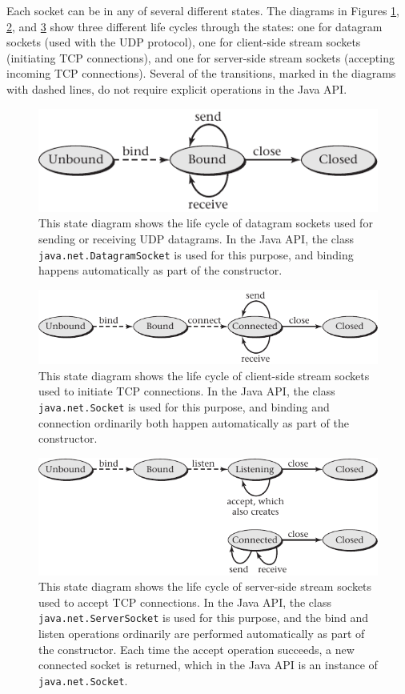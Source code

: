 Each socket can be in any of several different states.  The diagrams
in Figures \ref{scan-9-3}, \ref{scan-9-4}, and \ref{scan-9-5} show
three different life cycles through the states: one for datagram
sockets (used with the UDP protocol), one for client-side stream
sockets (initiating TCP connections), and one for server-side stream
sockets (accepting incoming TCP connections).  Several of the
transitions, marked in the diagrams with dashed lines, do not require
explicit operations in the Java API.
\begin{figure}
\centerline{\includegraphics{hail_f0904}}
\caption{This state diagram shows the life cycle of datagram sockets used for sending or receiving UDP
  datagrams.  In the Java API, the class {\tt java.net.DatagramSocket} is
  used for this purpose, and binding happens automatically as part of
  the constructor.}
\label{scan-9-3}
\end{figure}
\begin{figure}
\centerline{\includegraphics{hail_f0905}}
\caption{This state diagram shows the life cycle of client-side stream
  sockets used to initiate TCP connections.
  In the Java API, the class {\tt java.net.Socket} is used for this purpose,
  and binding and connection ordinarily both happen automatically as
  part of the constructor.}
\label{scan-9-4}
\end{figure}
\begin{figure}
\centerline{\includegraphics{hail_f0906}}
\caption{This state diagram shows the life cycle of server-side stream
  sockets used to accept TCP
  connections.  In the Java API, the class {\tt java.net.ServerSocket} is
  used for this purpose, and the bind and listen operations ordinarily
  are performed automatically as part of the constructor.  Each time
  the accept operation succeeds, a new connected socket is returned,
  which in the Java API is an instance of {\tt java.net.Socket}.}
\label{scan-9-5}
\end{figure}
